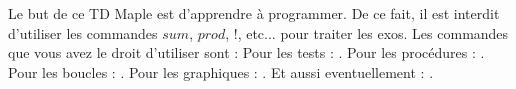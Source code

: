 \bigskip

\vfill\bigskip


\vfill\bigskip

\vfill\bigskip


\vfill\bigskip

\vfill\bigskip























\bye

Le but de ce TD Maple est d'apprendre \`a programmer. De ce fait, il est interdit d'utiliser les commandes $sum$, $prod$, $!$, etc... pour traiter les exos.\pn
Les commandes que vous avez le droit d'utiliser sont :  
\medskip\noindent
Pour les tests : .\pn 
Pour les proc\'edures : .\pn 
Pour les boucles : .\pn 
Pour les graphiques : .\pn 
Et aussi eventuellement : . 
\medskip

\bigskip









